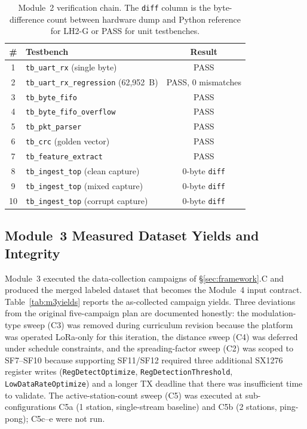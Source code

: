 \documentclass[conference]{IEEEtran}
\begin{document}
\begin{table}[t]
\centering
\caption{Module~2 verification chain. The \texttt{diff} column is the byte-difference count between hardware dump and Python reference for LH2-G or PASS for unit testbenches.}
\label{tab:scenarios}
\begin{tabular}{c l c}
\toprule
\textbf{\#} & \textbf{Testbench} & \textbf{Result} \\
\midrule
1 & \texttt{tb\_uart\_rx} (single byte)        & PASS \\
2 & \texttt{tb\_uart\_rx\_regression} (62{,}952~B) & PASS, 0 mismatches \\
3 & \texttt{tb\_byte\_fifo}                    & PASS \\
4 & \texttt{tb\_byte\_fifo\_overflow}          & PASS \\
5 & \texttt{tb\_pkt\_parser}                   & PASS \\
6 & \texttt{tb\_crc} (golden vector)           & PASS \\
7 & \texttt{tb\_feature\_extract}              & PASS \\
8 & \texttt{tb\_ingest\_top} (clean capture)   & 0-byte \texttt{diff} \\
9 & \texttt{tb\_ingest\_top} (mixed capture)   & 0-byte \texttt{diff} \\
10 & \texttt{tb\_ingest\_top} (corrupt capture)& 0-byte \texttt{diff} \\
\bottomrule
\end{tabular}
\end{table}

\subsection{Module~3 Measured Dataset Yields and Integrity}\label{sec:m3measured}

Module~3 executed the data-collection campaigns of \S\ref{sec:framework}.C and produced the merged labeled dataset that becomes the Module~4 input contract. Table~\ref{tab:m3yields} reports the as-collected campaign yields. Three deviations from the original five-campaign plan are documented honestly: the modulation-type sweep (C3) was removed during curriculum revision because the platform was operated LoRa-only for this iteration, the distance sweep (C4) was deferred under schedule constraints, and the spreading-factor sweep (C2) was scoped to SF7--SF10 because supporting SF11/SF12 required three additional SX1276 register writes (\texttt{RegDetectOptimize}, \texttt{RegDetectionThreshold}, \texttt{LowDataRateOptimize}) and a longer TX deadline that there was insufficient time to validate. The active-station-count sweep (C5) was executed at sub-configurations C5a (1 station, single-stream baseline) and C5b (2 stations, ping-pong); C5c--e were not run.
\end{document}
